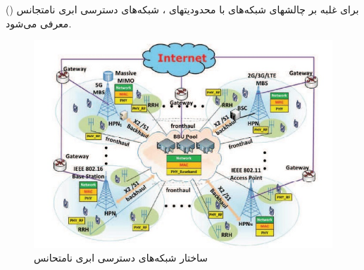 \begin{itemize}
برای غلبه بر چالشهای شبکه‌های  با محدودیتهای ، شبکه‌های دسترسی ابری نامتجانس () معرفی می‌شود\cite{ fogComputing, heterogeneous, fogEdge}.
\begin{figure}
  \centering
    \includegraphics[scale = 0.8]{./fig/hc}
  \caption{ ساختار شبکه‌های دسترسی ابری نامتحانس \cite{heterogeneous}  }
  \label{fig:hc}
\end{figure}


\end{itemize}
